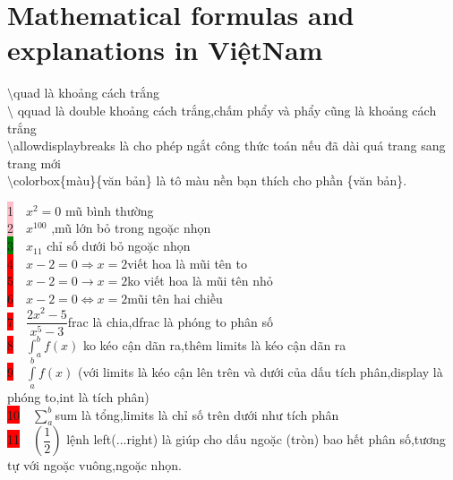 \documentclass{article}
\begin{document}
\Large\section{Mathematical formulas and explanations in ViệtNam}
\large $\setminus$quad là khoảng cách trắng\\

$\setminus$ qquad là double khoảng cách trắng,chấm phẩy và phẩy cũng là khoảng cách trắng\\

$\setminus$allowdisplaybreaks là cho phép ngắt công thức toán nếu đã dài quá trang sang trang mới\\

$\setminus$colorbox\{màu\}\{văn bản\} là tô màu nền bạn thích cho phần \{văn bản\}.

\colorbox{pink}{1}$\quad x^2=0$  \quad     mũ bình thường \\

\colorbox{pink}{2}$\quad x^{100}$ \quad ,mũ lớn bỏ trong ngoặc nhọn\\

\colorbox{green}{3}$\quad x_{11}$ \quad chỉ số dưới bỏ ngoặc nhọn\\

\colorbox{red}{4}$\quad  x-2=0 \Rightarrow x=2 $\quad viết hoa là mũi tên to\\

\colorbox{red}{5}$\quad x-2=0 \rightarrow x=2  $\quad  ko viết hoa là mũi tên nhỏ\\

\colorbox{red}{6}$\quad x-2=0 \Leftrightarrow x=2 $\quad mũi tên hai chiều\\

\colorbox{red}{7}$\quad\dfrac{2x^2-5}{x^5-3}$\quad frac là chia,dfrac là phóng to phân số\\

\colorbox{red}{8}$\quad \displaystyle\int_a^bf(x)$ \quad ko kéo cận dãn ra,thêm limits là kéo cận dãn ra\\

\colorbox{red}{9}$\quad\displaystyle\int\limits_a^bf(x)$ (với limits là kéo cận lên trên và dưới của dấu tích phân,display là phóng to,int là tích phân)\\

\colorbox{red}{10}$\quad\displaystyle\sum\limits_a^b$\quad sum là tổng,limits là chỉ số trên dưới như tích phân\\

\colorbox{red}{11}$\quad\left(\dfrac{1}{2}\right)$ \quad lệnh left(...right) là giúp cho dấu ngoặc (tròn) bao hết phân số,tương tự với ngoặc vuông,ngoặc nhọn.\\
\end{document}
